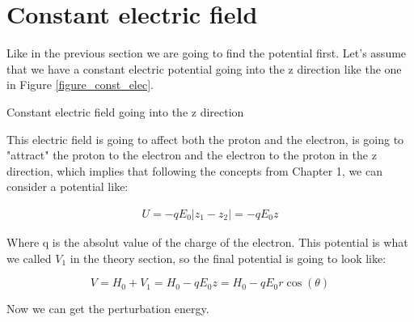 \section{Constant electric field}

Like in the previous section we are going to find the potential first. Let's assume that we have a constant electric potential going into the z direction like the one in Figure \ref{figure_const_elec}.

\begin{marginfigure}[3cm]
  \label{figure_const_elec}
  \caption{Constant electric field going into the z direction}
\end{marginfigure}

This electric field is going to affect both the proton and the electron, is going to "attract" the proton to the electron and the electron to the proton in the z direction, which implies that following the concepts from Chapter 1, we can consider a potential like:

\begin{equation}
  \begin{array}{c}
    U = - q E_0 |z_1-z_2| = - q E_0 z
  \end{array}
\end{equation}

Where q is the absolut value of the charge of the electron. This potential is what we called $V_1$ in the theory section, so the final potential is going to look like:

\begin{equation}
  V = H_0 + V_1 = H_0 - q E_0 z = H_0 - q E_0 r \cos(\theta)
\end{equation}

Now we can get the perturbation energy.

